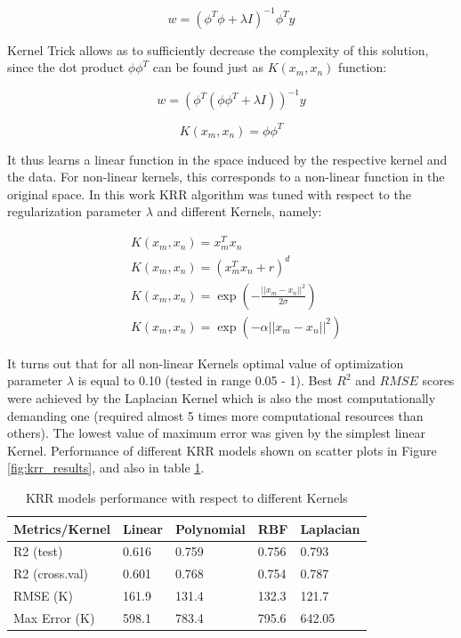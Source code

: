 \begin{equation}
w = (\phi^T\phi+\lambda I)^{-1}\phi^Ty
\end{equation}

Kernel Trick allows as to sufficiently decrease the complexity of this solution, since the dot product $\phi\phi^T$ can be found just as $K(x_m,x_n)$ function:

\begin{equation}
w = (\phi^T(\phi\phi^T+ \lambda I))^{-1} y
\end{equation}

\begin{equation}
K(x_m,x_n) = \phi \phi ^ T
\end{equation}

It thus learns a linear function in the space induced by the respective kernel and the data. For non-linear kernels, this corresponds to a non-linear function in the original space.
In this work KRR algorithm was tuned with respect to the regularization parameter $\lambda$ and different Kernels, namely:

\begin{align}
&K(x_m,x_n) = x_m^T x_n\\
&K(x_m,x_n) = (x_m^T x_n + r) ^ d \\
&K(x_m,x_n) = \exp \left(- \frac{|| x_m - x_n || ^ 2}{2\sigma} \right)\\
&K(x_m,x_n) = \exp \left( -\alpha ||x_m - x_n || ^ 2 \right)
\end{align}


It turns out that for all non-linear Kernels optimal value of optimization parameter $\lambda$ is equal to 0.10 (tested in range 0.05 - 1). 
Best $R^2$ and $RMSE$ scores were achieved by the Laplacian Kernel which is also the most computationally demanding one (required almost 5 times more computational resources than others). 
The lowest value of maximum error was given by the simplest linear Kernel.
Performance of different KRR models shown on scatter plots in Figure \ref{fig:krr_results}, and also in table \ref{tab:krr_results}.

\begin{table}[H]
\centering
\caption{KRR models performance with respect to different Kernels}
\begin{tabular}{|p{3cm}|p{2.5cm}|p{2.5cm}|p{2.5cm}|p{2.5cm}|}
\hline 
Metrics/Kernel & Linear & Polynomial & RBF & Laplacian \\ 
\hline 
R2 (test) & 0.616
 & 0.759 & 0.756 & 0.793 \\ 
R2 (cross.val) & 0.601 & 0.768 & 0.754 & 0.787 \\ 
RMSE (K) & 161.9 & 
131.4 & 132.3 & 121.7 \\ 
Max Error (K) & 598.1 & 783.4 & 795.6 & 642.05 \\ 
\hline 
\end{tabular} 
\label{tab:krr_results}
\end{table}

